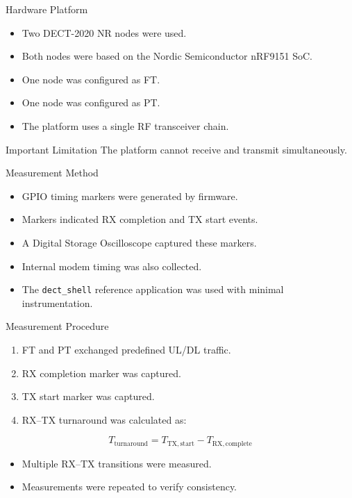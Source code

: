 \documentclass[10pt]{beamer}
\begin{document}
\begin{frame}{Hardware Platform}
\begin{itemize}
    \item Two DECT-2020 NR nodes were used.
    \item Both nodes were based on the Nordic Semiconductor nRF9151 SoC.
    \item One node was configured as FT.
    \item One node was configured as PT.
    \item The platform uses a single RF transceiver chain.
\end{itemize}

\begin{block}{Important Limitation}
The platform cannot receive and transmit simultaneously.
\end{block}
\end{frame}

\begin{frame}{Measurement Method}
\begin{itemize}
    \item GPIO timing markers were generated by firmware.
    \item Markers indicated RX completion and TX start events.
    \item A Digital Storage Oscilloscope captured these markers.
    \item Internal modem timing was also collected.
    \item The \texttt{dect\_shell} reference application was used with minimal instrumentation.
\end{itemize}
\end{frame}

\begin{frame}{Measurement Procedure}
\begin{enumerate}
    \item FT and PT exchanged predefined UL/DL traffic.
    \item RX completion marker was captured.
    \item TX start marker was captured.
    \item RX--TX turnaround was calculated as:
\end{enumerate}

\begin{equation}
T_{\mathrm{turnaround}} =
T_{\mathrm{TX,start}} -
T_{\mathrm{RX,complete}}
\end{equation}

\begin{itemize}
    \item Multiple RX--TX transitions were measured.
    \item Measurements were repeated to verify consistency.
\end{itemize}
\end{frame}
\end{document}
